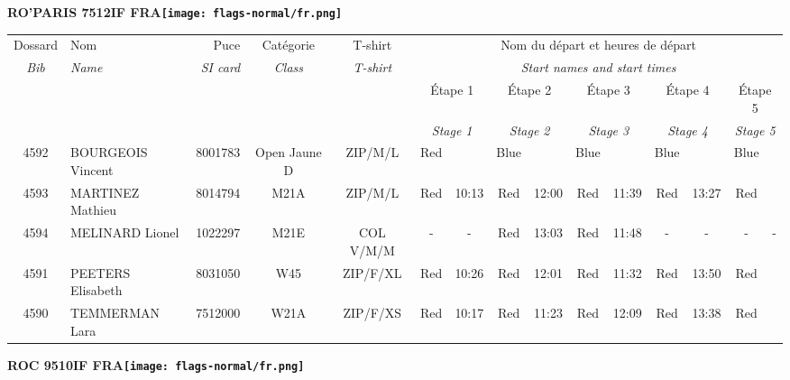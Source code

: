 \documentclass{report}
\begin{document}
\newpage
  \Huge \centering \bfseries RO'PARIS 7512IF FRA\normalfont \footnotesize \sffamily \hfill \texttt{[image: flags-normal/fr.png]} \newline 
  \begin{longtable}{|c|l|r|c|c|*{5}{cc|}}
    Dossard & Nom  & Puce    & Catégorie & T-shirt & \multicolumn{10}{c|}{Nom du départ et heures de départ} \\
    \itshape Bib     & \itshape Name & \itshape SI card & \itshape Class  & \itshape  T-shirt  & \multicolumn{10}{c|}{\itshape Start names and start times} \\
    \hline
    & & & & & \multicolumn{2}{c|}{Étape 1} & \multicolumn{2}{c|}{Étape 2} & \multicolumn{2}{c|}{Étape 3} & \multicolumn{2}{c|}{Étape 4} & \multicolumn{2}{c|}{Étape 5} \\
    & & & & & \multicolumn{2}{c|}{\itshape Stage 1} & \multicolumn{2}{c|}{\itshape Stage 2} & \multicolumn{2}{c|}{\itshape Stage 3} & \multicolumn{2}{c|}{\itshape Stage 4} & \multicolumn{2}{c|}{\itshape Stage 5} \\
    \hline
    4592 & BOURGEOIS Vincent & 8001783 & Open Jaune D & ZIP/M/L & Red &   & Blue &   & Blue &   & Blue &   & Blue &  \\
    4593 & MARTINEZ Mathieu & 8014794 & M21A & ZIP/M/L & Red & 10:13 & Red & 12:00 & Red & 11:39 & Red & 13:27 & Red &  \\
    4594 & MELINARD Lionel & 1022297 & M21E & COL V/M/M & - &  - & Red & 13:03 & Red & 11:48 & - &  - & - &  -\\
    4591 & PEETERS Elisabeth & 8031050 & W45 & ZIP/F/XL & Red & 10:26 & Red & 12:01 & Red & 11:32 & Red & 13:50 & Red &  \\
    4590 & TEMMERMAN Lara & 7512000 & W21A & ZIP/F/XS & Red & 10:17 & Red & 11:23 & Red & 12:09 & Red & 13:38 & Red &  \\
  \end{longtable}
\newpage
  \Huge \centering \bfseries ROC 9510IF FRA\normalfont \footnotesize \sffamily \hfill \texttt{[image: flags-normal/fr.png]} \newline 
\end{document}
